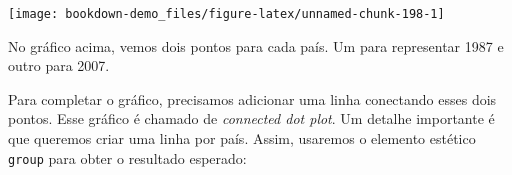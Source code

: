 \documentclass[]{book}
\newenvironment{Shaded}{\begin{snugshade}}{\end{snugshade}}
\newcommand{\KeywordTok}[1]{\textcolor[rgb]{0.13,0.29,0.53}{\textbf{#1}}}
\newcommand{\DataTypeTok}[1]{\textcolor[rgb]{0.13,0.29,0.53}{#1}}
\newcommand{\DecValTok}[1]{\textcolor[rgb]{0.00,0.00,0.81}{#1}}
\newcommand{\StringTok}[1]{\textcolor[rgb]{0.31,0.60,0.02}{#1}}
\newcommand{\OperatorTok}[1]{\textcolor[rgb]{0.81,0.36,0.00}{\textbf{#1}}}
\newcommand{\NormalTok}[1]{#1}
\begin{document}
\begin{Shaded}
\end{Shaded}

\begin{center}\texttt{[image: bookdown-demo\_files/figure-latex/unnamed-chunk-198-1]} \end{center}

No gráfico acima, vemos dois pontos para cada país. Um para representar
1987 e outro para 2007.

Para completar o gráfico, precisamos adicionar uma linha conectando
esses dois pontos. Esse gráfico é chamado de \emph{connected dot plot}.
Um detalhe importante é que queremos criar uma linha por país. Assim,
usaremos o elemento estético \texttt{group} para obter o resultado
esperado:
\end{document}
